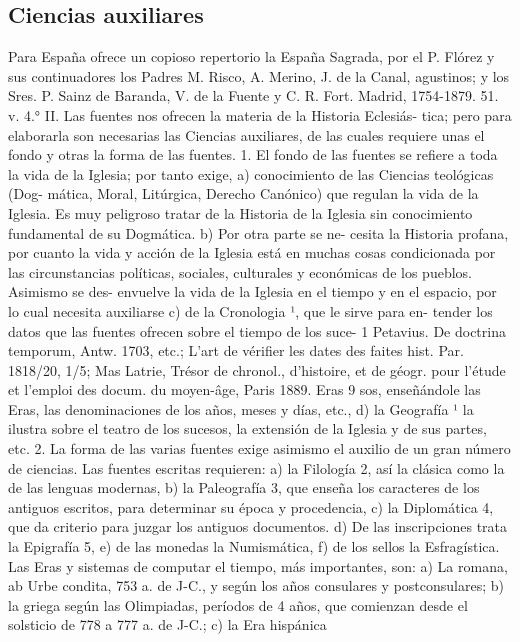 \raggedbottom{} \documentclass[12pt]{book}
\begin{document}
\subsection{Ciencias auxiliares} Para España ofrece un copioso repertorio la España Sagrada, por el
P. Flórez y sus continuadores los Padres M. Risco, A. Merino, J. de la
Canal, agustinos; y los Sres. P. Sainz de Baranda, V. de la Fuente y C. R.
Fort. Madrid, 1754-1879. 51. v. 4.°
II. Las fuentes nos ofrecen la materia de la Historia Eclesiás-
tica; pero para elaborarla son necesarias las Ciencias auxiliares, de
las cuales requiere unas el fondo y otras la forma de las fuentes.
1. El fondo de las fuentes se refiere a toda la vida de la Iglesia;
por tanto exige, a) conocimiento de las Ciencias teológicas (Dog-
mática, Moral, Litúrgica, Derecho Canónico) que regulan la vida de
la Iglesia. Es muy peligroso tratar de la Historia de la Iglesia sin
conocimiento fundamental de su Dogmática. b) Por otra parte se ne-
cesita la Historia profana, por cuanto la vida y acción de la Iglesia
está en muchas cosas condicionada por las circunstancias políticas,
sociales, culturales y económicas de los pueblos. Asimismo se des-
envuelve la vida de la Iglesia en el tiempo y en el espacio, por lo
cual necesita auxiliarse c) de la Cronologia ¹, que le sirve para en-
tender los datos que las fuentes ofrecen sobre el tiempo de los suce-
1 Petavius. De doctrina temporum, Antw. 1703, etc.; L'art de vérifier les dates des
faites hist. Par. 1818/20, 1/5; Mas Latrie, Trésor de chronol., d'histoire, et de géogr.
pour l'étude et l'emploi des docum. du moyen-âge, Paris 1889.
 Eras
9
sos, enseñándole las Eras, las denominaciones de los años, meses y
días, etc., d) la Geografía ¹ la ilustra sobre el teatro de los sucesos,
la extensión de la Iglesia y de sus partes, etc.
2. La forma de las varias fuentes exige asimismo el auxilio de
un gran número de ciencias. Las fuentes escritas requieren: a) la
Filología 2, así la clásica como la de las lenguas modernas, b) la
Paleografía 3, que enseña los caracteres de los antiguos escritos,
para determinar su época y procedencia, c) la Diplomática 4, que da
criterio para juzgar los antiguos documentos. d) De las inscripciones
trata la Epigrafía 5, e) de las monedas la Numismática, f) de los
sellos la Esfragística.
Las Eras y sistemas de computar el tiempo, más importantes, son: a) La
romana, ab Urbe condita, 753 a. de J-C., y según los años consulares y
postconsulares; b) la griega según las Olimpiadas, períodos de 4 años, que
comienzan desde el solsticio de 778 a 777 a. de J-C.; c) la Era hispánica
\end{document}
